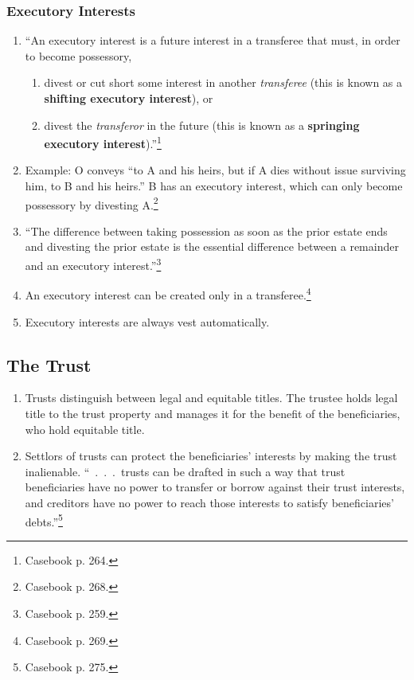 \subsubsection{Executory Interests}

\begin{enumerate}
    \item ``An executory interest is a future interest in a transferee that 
    must, in order to become possessory,
    \begin{enumerate}
        \item divest or cut short some interest in another \emph{transferee} 
        (this is known as a \textbf{shifting executory interest}), or
        \item divest the \emph{transferor} in the future (this is known as a 
        \textbf{springing executory interest}).''\footnote{Casebook p. 264.}
    \end{enumerate}
    \item Example: O conveys ``to A and his heirs, but if A dies without issue 
    surviving him, to B and his heirs.'' B has an executory interest, which 
    can only become possessory by divesting A.\footnote{Casebook p. 268.}
    \item ``The difference between taking possession as soon as the prior 
    estate ends and divesting the prior estate is the essential difference 
    between a remainder and an executory interest.''\footnote{Casebook p. 259.}
    \item An executory interest can be created only in a 
    transferee.\footnote{Casebook p. 269.}
    \item Executory interests are always vest automatically.
\end{enumerate}


\subsection{The Trust}

\begin{enumerate}
    \item Trusts distinguish between legal and equitable titles. The trustee 
    holds legal title to the trust property and manages it for the benefit of 
    the beneficiaries, who hold equitable title.
    \item Settlors of trusts can protect the beneficiaries' interests by 
    making the trust inalienable. ``~.~.~.~trusts can be drafted in such a way 
    that trust beneficiaries have no power to transfer or borrow against their 
    trust interests, and creditors have no power to reach those interests to 
    satisfy beneficiaries' debts.''\footnote{Casebook p. 275.}
\end{enumerate}

